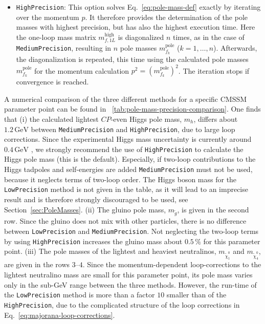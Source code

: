 \documentclass[final,3p,11pt,pdflatex]{elsarticle}
\newcommand{\code}[1]{\lstinline|#1|}  %
\newcommand{\unit}[1]{\,\text{#1}}      %
\newcommand{\pole}{\text{pole}}
\newcommand{\secref}[1]{Section~\ref{#1}}
\newcommand{\tabref}[1]{\tablename~\ref{#1}}
\begin{document}
\begin{itemize}
\item \code{HighPrecision}: This option solves
  Eq.~\eqref{eq:pole-mass-def} exactly by iterating over the momentum
  $p$.  It therefore provides the determination of the pole masses
  with highest precision, but has also the highest execution time.
  Here the one-loop mass matrix $m_{f,1L}^\text{high}$ is diagonalized
  $n$ times, as in the case of \code{MediumPrecision},
  resulting in $n$ pole masses $m_{f_k}^\pole$ ($k = 1,\ldots,n$).
  Afterwards, the diagonalization is repeated, this time using the
  calculated pole masses $m_{f_k}^\pole$ for the momentum calculation
  $p^2 = (m_{f_k}^\pole)^2$.  The iteration stops if convergence is
  reached.
\end{itemize}
%
A numerical comparison of the three different methods for a specific
CMSSM parameter point can be found in
\tabref{tab:pole-mass-precision-comparison}.  One finds that
%
(i) the calculated lightest $CP$-even Higgs pole mass, $m_h$, differs
about $1.2\unit{GeV}$ between \code{MediumPrecision} and
\code{HighPrecision}, due to large loop corrections.  Since the
experimental Higgs mass uncertainty is currently around
$0.4\unit{GeV}$ \cite{Beringer:1900zz}, we strongly recommend the use
of \code{HighPrecision} to calculate the Higgs pole mass (this is the
default).  Especially, if two-loop contributions to the Higgs tadpoles
and self-energies are added \code{MediumPrecision} must not be used,
because it neglects terms of two-loop order.  The Higgs boson mass for
the \code{LowPrecision} method is not given in the table, as it will
lead to an imprecise result and is therefore strongly discouraged to
be used, see \secref{sec:PoleMasses}.
%
(ii) The gluino pole mass, $m_{\tilde{g}}$, is given in the second
row.  Since the gluino does not mix with other particles, there is no
difference between \code{LowPrecision} and \code{MediumPrecision}.
Not neglecting the two-loop terms by using \code{HighPrecision}
increases the gluino mass about $0.5\unit{\%}$ for this parameter point.
%
(iii) The pole masses of the lightest and heaviest neutralinos,
$m_{\tilde{\chi}_1^0}$ and $m_{\tilde{\chi}_4^0}$, are given in the rows
$3$--$4$.  Since the
momentum-dependent loop-corrections to the lightest neutralino mass
are small for this parameter point, its pole mass varies only in the
sub-GeV range between the three methods.  However, the run-time of the
\code{LowPrecision} method is more than a factor $10$ smaller than of
the \code{HighPrecision}, due to the complicated structure of the loop
corrections in Eq.~\eqref{eq:majorana-loop-corrections}.
\end{document}
